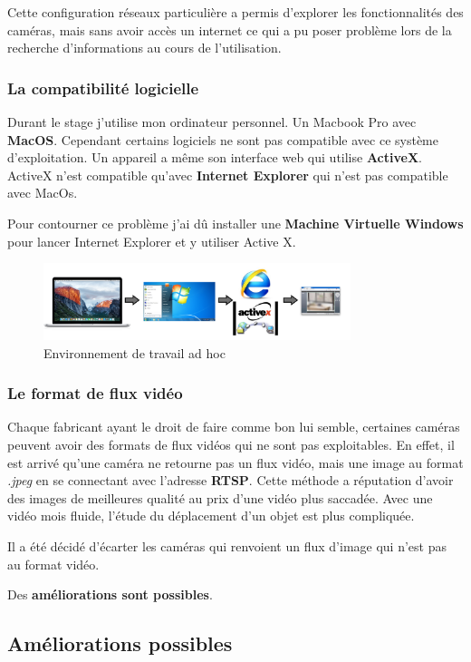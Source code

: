    Cette configuration réseaux particulière a permis d'explorer les fonctionnalités des caméras, mais sans avoir accès un internet ce qui a pu poser problème lors de la recherche d'informations au cours de l'utilisation.
    
		\subsubsection{La compatibilité logicielle}
	Durant le stage j'utilise mon ordinateur personnel. Un Macbook Pro avec \textbf{MacOS}. Cependant certains logiciels ne sont pas compatible avec ce système d'exploitation. Un appareil a même son interface web qui utilise \textbf{ActiveX}. ActiveX n'est compatible qu'avec \textbf{Internet Explorer} qui n'est pas compatible avec MacOs. 
    
    Pour contourner ce problème j'ai dû installer une \textbf{Machine Virtuelle Windows} pour lancer Internet Explorer et y utiliser Active X.
\begin{figure}[H]
    \includegraphics[width=0.8\textwidth]{img/Aesthetic_graph.png}
    \centering
    \caption{Environnement de travail ad hoc}
\end{figure}

    \subsubsection{Le format de flux vidéo}
    Chaque fabricant ayant le droit de faire comme bon lui semble, certaines caméras peuvent avoir des formats de flux vidéos qui ne sont pas exploitables. En effet, il est arrivé qu'une caméra ne retourne pas un flux vidéo, mais une image au format \textit{.jpeg} en se connectant avec l'adresse \textbf{RTSP}. Cette méthode a réputation d'avoir des images de meilleures qualité au prix d'une vidéo plus saccadée. Avec une vidéo mois fluide, l'étude du déplacement d'un objet est plus compliquée.

Il a été décidé d'écarter les caméras qui renvoient un flux d'image qui n'est pas au format vidéo. 

Des \textbf{améliorations sont possibles}. 

\subsection{Améliorations possibles}

